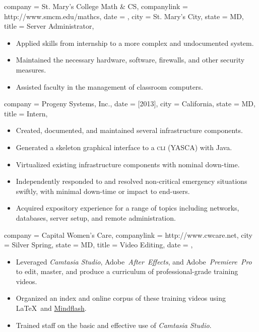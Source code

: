 \documentclass[
textout=\jobname.cv.txt,
textout preamble = preamble.txt,
]{bettercv}
\newcommand \software[1] {\textsl{#1}}
\begin{document}
\begin{position}
  {
    company = St. Mary's College \Dash Math \& CS,
    companylink = http://www.smcm.edu/mathcs,
    date    = ,
    city    = St. Mary's City,
    state   = MD,
    title   = Server Administrator,
  }

\begin{itemize}
\item Applied skills from internship to a more complex and undocumented system.
\item Maintained the necessary hardware, software, firewalls, and other security measures.
\item Assisted faculty in the management of classroom computers.
\end{itemize}
\end{position}

\begin{position}
  {
    company = {Progeny Systems, Inc.},
    date    = [2013],
    city    = California,
    state   = MD,
    title   = Intern,
  }

\begin{itemize}
\item Created, documented, and maintained several infrastructure components.
\item Generated a skeleton graphical interface to a \textsc{cli} (YASCA) with Java.
\item Virtualized existing infrastructure components with nominal down-time.
\item Independently responded to and resolved non-critical emergency situations swiftly, with minimal down-time or impact to end-users.
\item Acquired expository experience for a range of topics including
  networks,
  databases,
  server setup, and
  remote administration.
\end{itemize}
\end{position}

\begin{position}
  {
    company = Capital Women's Care,
    companylink = http://www.cwcare.net,
    city    = Silver Spring,
    state   = MD,
    title   = Video Editing,
    date    = ,
  }

\begin{itemize}
\item Leveraged \software{Camtasia Studio},
  Adobe~\software{After~Effects}, and
  Adobe~\software{Premiere~Pro} to edit, master, and produce
    a curriculum of professional-grade training videos.
  \item Organized an index and online corpus of these training videos
    using \LaTeX\ and \href{http://www.mindflash.com}{Mindflash}.
\item Trained staff on the basic and effective use of \software{Camtasia Studio}.
\end{itemize}
\end{position}
\end{document}
